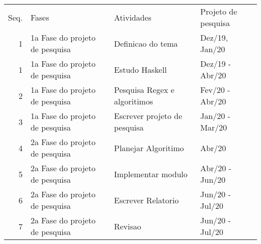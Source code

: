 \begin{center}
\begin{tabular}{rlll}
Seq. & Fases & Atividades & Projeto de pesquisa\\
1 & 1a Fase do projeto de pesquisa & Definicao do tema & Dez/19, Jan/20\\
1 & 1a Fase do projeto de pesquisa & Estudo Haskell & Dez/19 - Abr/20\\
2 & 1a Fase do projeto de pesquisa & Pesquisa Regex e algoritimos & Fev/20 - Abr/20\\
3 & 1a Fase do projeto de pesquisa & Escrever projeto de pesquisa & Jan/20 - Mar/20\\
4 & 2a Fase do projeto de pesquisa & Planejar Algoritimo & Abr/20\\
5 & 2a Fase do projeto de pesquisa & Implementar modulo & Abr/20 - Jun/20\\
6 & 2a Fase do projeto de pesquisa & Escrever Relatorio & Jun/20 - Jul/20\\
7 & 2a Fase do projeto de pesquisa & Revisao & Jun/20 - Jul/20\\
\end{tabular}
\end{center}
